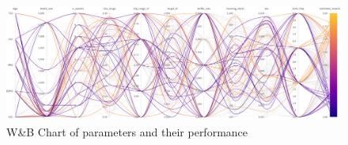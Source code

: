 \documentclass[../xlapes02]{subfiles}
\begin{document}
    \begin{figure}[H]
        \centering
        \includegraphics[width=\linewidth]{image/wandb/wb3}
        \caption{W\&B Chart of parameters and their performance}
        \label{fig:wb-chart3}
    \end{figure}
\end{document}
